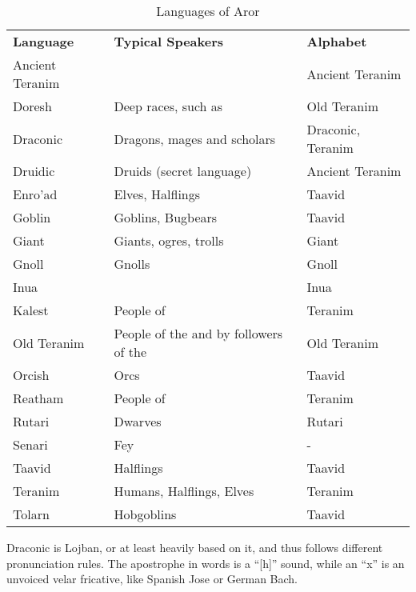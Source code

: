 \begin{table*}[!htb]
  \caption{Languages of Aror} \label{tbl:Languages}
  \begin{tabular}{l p{8cm} l}
    \textbf{Language} & \textbf{Typical Speakers} & \textbf{Alphabet} \\
    Ancient Teranim & \nameref{sec:Tynrikke}      & Ancient Teranim \\
    Doresh          & Deep races, such as \nameref{sec:Deepkin} & Old Teranim \\
    Draconic        & Dragons, mages and scholars & Draconic, Teranim \\
    Druidic         & Druids (secret language)    & Ancient Teranim \\
    Enro'ad         & Elves, Halflings            & Taavid \\
    Goblin          & Goblins, Bugbears           & Taavid \\
    Giant           & Giants, ogres, trolls       & Giant \\
    Gnoll           & Gnolls                      & Gnoll \\
    Inua            & \nameref{sec:Inua}          & Inua \\
    Kalest          & People of \nameref{sec:Arania} & Teranim \\
    Old Teranim     & People of the \nameref{sec:Dirgewood} and by followers of the \nameref{sec:Old Ways} & Old Teranim \\
    Orcish          & Orcs                        & Taavid \\
    Reatham         & People of \nameref{sec:Forsby} & Teranim \\
    Rutari          & Dwarves                     & Rutari \\
    Senari          & Fey                         & - \\
    Taavid          & Halflings                   & Taavid \\
    Teranim         & Humans, Halflings, Elves    & Teranim \\
    Tolarn          & Hobgoblins                  & Taavid \\
  \end{tabular}
\end{table*}

\begin{note}
  Draconic is Lojban, or at least heavily based on it, and thus follows
  different pronunciation rules. The apostrophe in words is a ``[h]'' sound,
  while an ``x'' is an unvoiced velar fricative, like Spanish Jose or German
  Bach.
\end{note}

